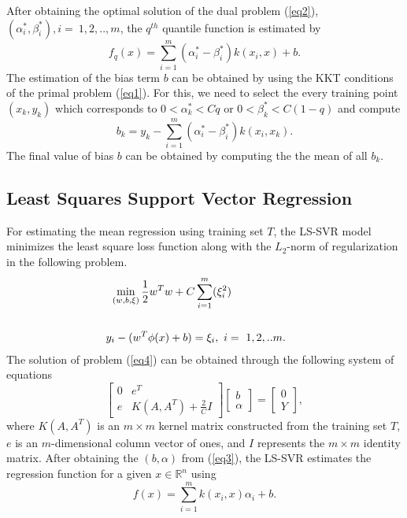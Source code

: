 \documentclass[10pt]{article} %
\begin{document}
After obtaining the optimal solution of the dual problem (\ref{eq2}), $(\alpha_i^{*}, \beta_i^{*}), i= ~1,2,..,m$, the $q^{th}$ quantile function is estimated by 
\begin{equation}
    f_q(x) = \sum_{i=1}^{m}(\alpha_i^{*}- \beta_i^{*})k(x_i,x) + b . \label{out1}
\end{equation}
The estimation of the bias term $b$ can be obtained by using the  KKT conditions of the primal problem (\ref{eq1}). For this, we need to select the every training point $(x_k,y_k)$ which corresponds to $0 < \alpha_k^{*} < Cq$ or $0 < \beta_k^{*} < C(1-q)$ and compute
\begin{equation}
    b_k= y_k - \sum \limits_{i=1}^{m}(\alpha_i^{*}-\beta_i^{*}) k(x_i,x_k).
\end{equation}
The final value of bias $b$ can be obtained by computing the the mean of  all $b_k$. 

\subsection{Least Squares Support Vector Regression }
For estimating the mean regression using training set $T$, the LS-SVR model \cite{suykens2002weighted} minimizes the least square loss function along with the $L_2$-norm of regularization in the following problem.
  \begin{eqnarray}
     \min \limits_{(w,b,\xi)} \frac{1}{2} w^Tw + C\sum \limits_{i=1}^{m} (\xi^2_i) \nonumber \\
     & \hspace{-90mm}\mbox{subject to,} \nonumber \\
     & \hspace{-40mm} y_i- (w^T\phi(x) +b) = \xi_i,~ i =~1,2,..m.
     \label{eq4}
 \end{eqnarray}   
The solution of problem (\ref{eq4}) can be obtained through the  following system of equations
  \begin{equation}
  \begin{bmatrix}
  0 & e^T\\
  e & K(A,A^T) + \frac{2}{C}I
  \end{bmatrix} \begin{bmatrix}
  b \\
  \alpha
  \end{bmatrix} =
  \begin{bmatrix}
  0 \\
  Y
  \end{bmatrix}, \label{eq3}
  \end{equation}
where \( K(A, A^T) \) is an \( m \times m \) kernel matrix constructed from the training set \( T \), \( e \) is an \( m \)-dimensional column vector of ones, and \( I \) represents the \( m \times m \) identity matrix.
After obtaining the $(b,\alpha)$ from (\ref{eq3}), the LS-SVR estimates the regression function for a given $x \in \mathbb{R}^n$ using
  \begin{equation}
  {f}(x) = \sum_{i=1}^{m}k(x_i,x)\alpha_i + b . \label{eq5}
  \end{equation}
  
\end{document}
